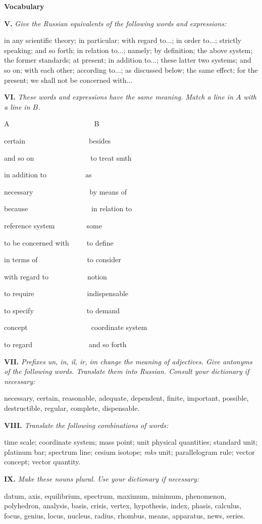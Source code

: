 \documentclass[a4paper]{article}
\newcommand{\ESect}[1]{\medskip\par{\large \textbf{#1}}\par}
\newcommand{\ETask}[2]{\medskip\par\textbf{#1.} \textit{#2}\par}
\newcommand{\ETypeWr}[1]{\par\begin{ttfamily}#1\end{ttfamily}\par}
\begin{document}
\ESect{Vocabulary}

\ETask{V}{Give the Russian equivalents of the following words and expressions:}
in any scientific theory; in particular; with regard to...; in order to...; strictly speaking; and so forth; in relation to...;
namely; by definition; the above system; the former standards; at present; in addition to...; these latter two systems; and
so on; with each other; according to...; as discussed below; the same effect; for the present; we shall not be concerned with...

\ETask{VI}{These words and expressions have the same meaning. Match a line in $A$ with a line in $B$.}
\ETypeWr{
A~~~~~~~~~~~~~~~~~~~~~~~~B

certain~~~~~~~~~~~~~~~~~~besides

and so on~~~~~~~~~~~~~~~~to treat smth

in addition to~~~~~~~~~~~as

necessary~~~~~~~~~~~~~~~~by means of

because~~~~~~~~~~~~~~~~~~in relation to

reference system~~~~~~~~~some

to be concerned with~~~~~to define

in terms of~~~~~~~~~~~~~~to consider

with regard to~~~~~~~~~~~notion

to require~~~~~~~~~~~~~~~indispensable

to specify~~~~~~~~~~~~~~~to demand

concept~~~~~~~~~~~~~~~~~~coordinate system

to regard~~~~~~~~~~~~~~~~and so forth
}

\ETask{VII}{Prefixes \textit{un}, \textit{in}, \textit{il}, \textit{ir}, \textit{im} change the meaning of adjectives. Give antonyms of the following words. Translate them
into Russian. Consult your dictionary if necessary:}
necessary, certain, reasonable, adequate, dependent, finite, important, possible, destructible, regular, complete, dispensable.

\ETask{VIII}{Translate the following combinations of words:}
time scale; coordinate system; mass point; unit physical quantities; standard unit; platinum bar; spectrum line; cesium
isotope; \textit{mks} unit; parallelogram rule; vector concept; vector quantity.

\ETask{IX}{Make these nouns plural. Use your dictionary if necessary:}
datum, axis, equilibrium, spectrum, maximum, minimum, phenomenon, polyhedron, analysis, basis, crisis, vertex, hypothesis,
index, phasis, calculus, focus, genius, locus, nucleus, radius, rhombus, means, apparatus, news, series.
\end{document}
